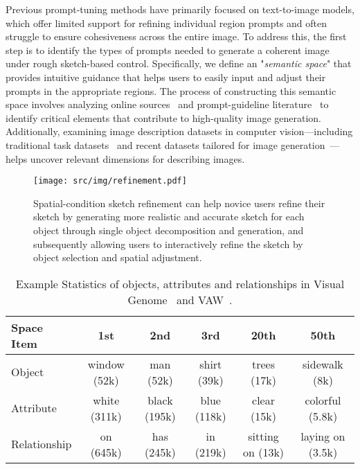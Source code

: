Previous prompt-tuning methods have primarily focused on text-to-image models, which offer limited support for refining individual region prompts and often struggle to ensure cohesiveness across the entire image.
To address this, the first step is to identify the types of prompts needed to generate a coherent image under rough sketch-based control.
Specifically, we define an "\emph{semantic space}" that provides intuitive guidance that helps users to easily input and adjust their prompts in the appropriate regions.
The process of constructing this semantic space involves analyzing online sources~\cite{sd,wang2022diffusiondb,civitai,xie2023prompt} and prompt-guideline literature~\cite{oppenlaender2023prompting,oppenlaender2023taxonomy,liu2022design} to identify critical elements that contribute to high-quality image generation. Additionally, examining image description datasets in computer vision—including traditional task datasets~\cite{caesar2018coco,pham2021learning,krishna2017visual} and recent datasets tailored for image generation~\cite{onoe2024docci}—helps uncover relevant dimensions for describing images.

\begin{figure*}[t]
    \centering
    \texttt{[image: src/img/refinement.pdf]}
    \vspace{-2mm}
    \caption{Spatial-condition sketch refinement can help novice users refine their sketch by generating more realistic and accurate sketch for each object through single object decomposition and generation, and subsequently allowing users to interactively refine the sketch by object selection and spatial adjustment.}
    \label{fig:decompose}
    \vspace{-3mm}
\end{figure*}

\begin{table*}[thb] 
    \centering
    \caption{Example Statistics of objects, attributes and relationships in Visual Genome~\cite{krishna2017visual} and VAW~\cite{pham2021learning}.}
    \vspace{-2mm}
    \begin{tabular}{lccccc}
    \hline 
    \textbf{Space Item} & \textbf{1st} & \textbf{2nd} & \textbf{3rd} & \textbf{20th} & \textbf{50th}  \\
    \hline 
    Object & window (52k)  & man (52k) & shirt (39k) & trees (17k) & sidewalk (8k)  \\
    Attribute & white (311k) & black (195k) &  blue (118k) & clear (15k) & colorful (5.8k)   \\
    Relationship  & on (645k) & has (245k) &  in (219k) & sitting on (13k) & laying on (3.5k)    \\
    \hline
    \end{tabular}
    \vspace{-1mm}
    \label{tab:statsitic}
\end{table*}

